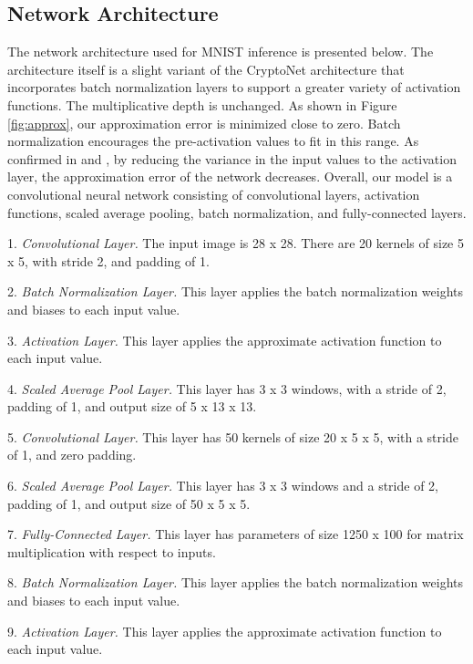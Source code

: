 \documentclass[conference]{IEEEtran}
\begin{document}
\subsection{Network Architecture}
The network architecture used for MNIST inference is presented below.
The architecture itself is a slight variant of the CryptoNet \cite{gilad2016cryptonets} architecture that incorporates batch normalization layers to support a greater variety of activation functions.  The multiplicative depth is unchanged.
As shown in Figure \ref{fig:approx}, our approximation error is minimized close to zero.
Batch normalization encourages the pre-activation values to fit in this range.
As confirmed in \cite{chabanne2017privacy} and \cite{hesamifard2017cryptodl},  by reducing the variance in the input values to the activation layer, the approximation error of the network decreases.
Overall, our model is a convolutional neural network \cite{lecun1995convolutional} consisting of convolutional layers, activation functions, scaled average pooling, batch normalization, and fully-connected layers.

1. {\em Convolutional Layer.} The input image is 28 x 28. There are 20 kernels of size 5 x 5, with stride 2, and padding of 1.

2. {\em Batch Normalization Layer.} This layer applies the batch normalization weights and biases to each input value.

3. {\em Activation Layer.} This layer applies the approximate activation function to each input value.

4. {\em Scaled Average Pool Layer.} This layer has 3 x 3 windows, with a stride of 2, padding of 1, and output size of 5 x 13 x 13.

5. {\em Convolutional Layer.} This layer has 50 kernels of size 20 x 5 x 5, with a stride of 1, and zero padding.

6. {\em Scaled Average Pool Layer.} This layer has 3 x 3 windows and a stride of 2, padding of 1, and output size of 50 x 5 x 5.

7. {\em Fully-Connected Layer.} This layer has parameters of size 1250 x 100 for matrix multiplication with respect to inputs.

8. {\em Batch Normalization Layer.} This layer applies the batch normalization weights and biases to each input value.

9. {\em Activation Layer.} This layer applies the approximate activation function to each input value.
\end{document}
